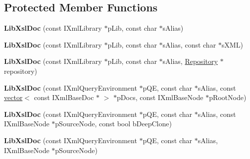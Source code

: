 \subsection*{\-Protected \-Member \-Functions}
\begin{DoxyCompactItemize}
\item 
\hypertarget{classgeneral__server_1_1LibXslDoc_a3dc9352ff4ed236812acd1f42febc3aa}{{\bfseries \-Lib\-Xsl\-Doc} (const \-I\-Xml\-Library $\ast$p\-Lib, const char $\ast$s\-Alias)}\label{classgeneral__server_1_1LibXslDoc_a3dc9352ff4ed236812acd1f42febc3aa}

\item 
\hypertarget{classgeneral__server_1_1LibXslDoc_a62df32e932c5bbee600a1b1cc27036e5}{{\bfseries \-Lib\-Xsl\-Doc} (const \-I\-Xml\-Library $\ast$p\-Lib, const char $\ast$s\-Alias, const char $\ast$s\-X\-M\-L)}\label{classgeneral__server_1_1LibXslDoc_a62df32e932c5bbee600a1b1cc27036e5}

\item 
\hypertarget{classgeneral__server_1_1LibXslDoc_a3730f209958fc56b5d744dbfe0dd4563}{{\bfseries \-Lib\-Xsl\-Doc} (const \-I\-Xml\-Library $\ast$p\-Lib, const char $\ast$s\-Alias, \hyperlink{classgeneral__server_1_1Repository}{\-Repository} $\ast$repository)}\label{classgeneral__server_1_1LibXslDoc_a3730f209958fc56b5d744dbfe0dd4563}

\item 
\hypertarget{classgeneral__server_1_1LibXslDoc_aa3424f546155c9b141dde7ca24cb12d4}{{\bfseries \-Lib\-Xsl\-Doc} (const \-I\-Xml\-Query\-Environment $\ast$p\-Q\-E, const char $\ast$s\-Alias, const \hyperlink{classvector}{vector}$<$ const \-I\-Xml\-Base\-Doc $\ast$ $>$ $\ast$p\-Docs, const \-I\-Xml\-Base\-Node $\ast$p\-Root\-Node)}\label{classgeneral__server_1_1LibXslDoc_aa3424f546155c9b141dde7ca24cb12d4}

\item 
\hypertarget{classgeneral__server_1_1LibXslDoc_af06657e8aa9a4d2050be4814a96b36f9}{{\bfseries \-Lib\-Xsl\-Doc} (const \-I\-Xml\-Query\-Environment $\ast$p\-Q\-E, const char $\ast$s\-Alias, const \-I\-Xml\-Base\-Node $\ast$p\-Source\-Node, const bool b\-Deep\-Clone)}\label{classgeneral__server_1_1LibXslDoc_af06657e8aa9a4d2050be4814a96b36f9}

\item 
\hypertarget{classgeneral__server_1_1LibXslDoc_ac61c49ae6aa9c577d98fec072a380037}{{\bfseries \-Lib\-Xsl\-Doc} (const \-I\-Xml\-Query\-Environment $\ast$p\-Q\-E, const char $\ast$s\-Alias, \-I\-Xml\-Base\-Node $\ast$p\-Source\-Node)}\label{classgeneral__server_1_1LibXslDoc_ac61c49ae6aa9c577d98fec072a380037}


\end{DoxyCompactItemize}
